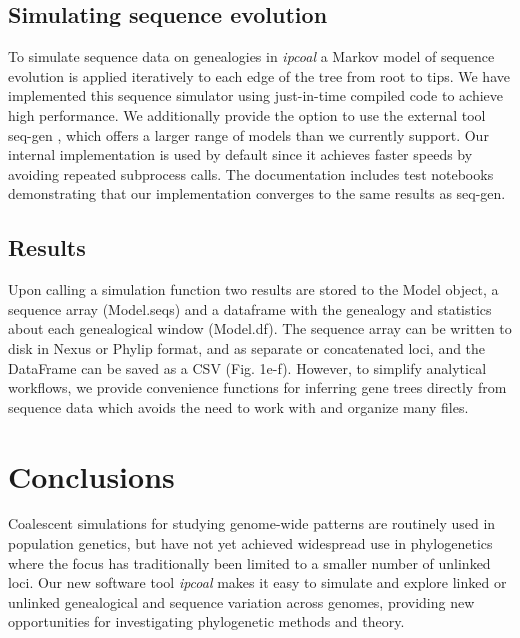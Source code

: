 \documentclass[11pt]{article}
\begin{document}
\subsection{Simulating sequence evolution}
To simulate sequence data on genealogies in \emph{ipcoal} a Markov model of sequence evolution is applied iteratively to each edge of the tree from root to tips. We have implemented this sequence simulator using just-in-time compiled code to achieve high performance. We additionally provide the option to use the external tool seq-gen \citep{rambaut_seqgen_1997}, which offers a larger range of models than we currently support. Our internal implementation is used by default since it achieves faster speeds by avoiding repeated subprocess calls. The documentation includes test notebooks demonstrating that our implementation converges to the same results as seq-gen.

\subsection{Results}
Upon calling a simulation function two results are stored to the Model object, a sequence array (Model.seqs) and a dataframe with the genealogy and statistics about each genealogical window (Model.df). The sequence array can be written to disk in Nexus or Phylip format, and as separate or concatenated loci, and the DataFrame can be saved as a CSV (Fig. 1e-f). However, to simplify analytical workflows, we provide convenience functions for inferring gene trees directly from sequence data which avoids the need to work with and organize many files.

\section{Conclusions}
\label{sec:conclusions}
Coalescent simulations for studying genome-wide patterns are routinely used in population genetics, but have not yet achieved widespread use in phylogenetics where the focus has traditionally been limited to a smaller number of unlinked loci. Our new software tool \emph{ipcoal} makes it easy to simulate and explore linked or unlinked genealogical and sequence variation across genomes, providing new opportunities for investigating phylogenetic methods and theory.
\end{document}
